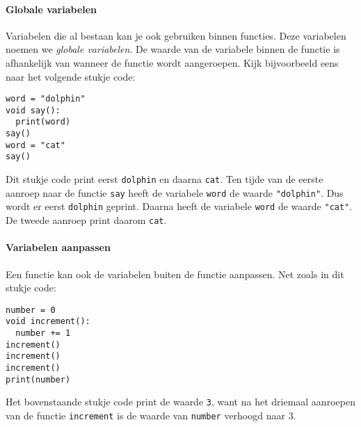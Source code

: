 \paragraph{Globale variabelen}

Variabelen die al bestaan kan je ook gebruiken binnen functies. Deze variabelen noemen we \emph{globale variabelen}. De waarde van de variabele binnen de functie is afhankelijk van wanneer de functie wordt aangeroepen. Kijk bijvoorbeeld eens naar het volgende stukje code:

\begin{verbatim}
word = "dolphin"
void say():
  print(word)
say()
word = "cat"
say()
\end{verbatim}

Dit stukje code print eerst \texttt{dolphin} en daarna \texttt{cat}. Ten tijde van de eerste aanroep naar de functie \texttt{say} heeft de variabele \texttt{word} de waarde \texttt{"dolphin"}. Dus wordt er eerst \texttt{dolphin} geprint. Daarna heeft de variabele \texttt{word} de waarde \texttt{"cat"}. De tweede aanroep print daarom \texttt{cat}.

\paragraph{Variabelen aanpassen} Een functie kan ook de variabelen buiten de functie aanpassen. Net zoals in dit stukje code:

\begin{verbatim}
number = 0
void increment():
  number += 1
increment()
increment()
increment()
print(number)
\end{verbatim}

Het bovenstaande stukje code print de waarde \texttt{3}, want na het driemaal aanroepen van de functie \texttt{increment} is de waarde van \texttt{number} verhoogd naar 3.
